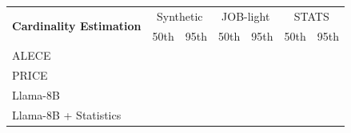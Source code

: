 \begin{tabular}{l|cc|cc|cc}
\toprule
\multirow{2}{*}{\textbf{Cardinality Estimation}} & \multicolumn{2}{c|}{Synthetic} & \multicolumn{2}{c|}{JOB-light} & \multicolumn{2}{c}{STATS} \\
 & 50th & 95th & 50th & 95th & 50th & 95th \\
\midrule
ALECE & \cellcolor{green1}{1.870} & \cellcolor{green1}{9.600} & \cellcolor{green1}{2.630} & \cellcolor{green2}{14.990} & \cellcolor{green3}{2.780} & \cellcolor{green4}{13.360} \\
PRICE & \cellcolor{green2}{1.680} & \cellcolor{green3}{7.140} & \cellcolor{green3}{2.030} & \cellcolor{green3}{13.990} & \cellcolor{green1}{4.170} & \cellcolor{green2}{28.690} \\
\midrule
Llama-8B & \cellcolor{green4}{1.395} & \cellcolor{green2}{7.543} & \cellcolor{green2}{2.048} & \cellcolor{green1}{17.331} & \cellcolor{green4}{2.653} & \cellcolor{green1}{163.16} \\
Llama-8B + Statistics & \cellcolor{green3}{1.636} & \cellcolor{green4}{4.881} & \cellcolor{green4}{1.776} & \cellcolor{green4}{8.866} & \cellcolor{green2}{3.081} & \cellcolor{green3}{28.231} \\
\bottomrule
\end{tabular}
